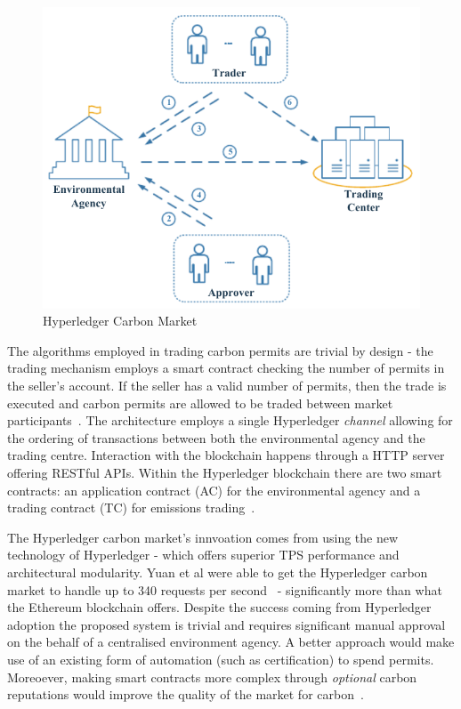 \begin{figure}[ht]
    \centering
    \includegraphics[scale=0.6]{photos/hyptrade.png}
    \caption{Hyperledger Carbon Market}
    \label{fig:htrad}
\end{figure}

The algorithms employed in trading carbon permits are
trivial by design - the trading mechanism employs a smart contract
checking the number of permits in the seller's account. If the
seller has a valid number of permits, then the trade is executed
and carbon permits are allowed to be traded between market
participants~\cite{article}. The architecture employs a single
Hyperledger \textit{channel} allowing for the ordering of transactions
between both the environmental agency and the trading centre.
Interaction with the blockchain happens through a HTTP server
offering RESTful APIs. Within the Hyperledger blockchain there
are two smart contracts: an application contract (AC) for the
environmental agency and a trading contract (TC) for emissions
trading~\cite{article}.

The Hyperledger carbon market's innvoation comes from
using the new technology of Hyperledger - which offers
superior TPS performance and architectural modularity. Yuan et al
were able to get the Hyperledger carbon market to handle
up to 340 requests per second~\cite{article} - significantly
more than what the Ethereum blockchain offers. Despite the
success coming from Hyperledger adoption the proposed system is
trivial and requires significant manual approval on the
behalf of a centralised environment agency. A better
approach would make use of an existing form of automation (such
as certification) to spend permits. Moreoever, making smart contracts
more complex through \textit{optional} carbon reputations
would improve the quality of the market for carbon~\cite{KHAQQI20188}.

